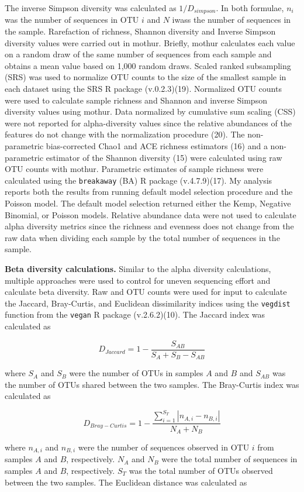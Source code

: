 \documentclass[
]{article}
\begin{document}
The inverse Simpson diversity was calculated as \(1/D_{simpson}\). In
both formulae, \(n_i\) was the number of sequences in OTU \(i\) and
\(N\) iwass the number of sequences in the sample. Rarefaction of
richness, Shannon diversity and Inverse Simpson diversity values were
carried out in mothur. Briefly, mothur calculates each value on a random
draw of the same number of sequences from each sample and obtains a mean
value based on 1,000 random draws. Scaled ranked subsampling (SRS) was
used to normalize OTU counts to the size of the smallest sample in each
dataset using the SRS R package (v.0.2.3)(19). Normalized OTU counts
were used to calculate sample richness and Shannon and inverse Simpson
diversity values using mothur. Data normalized by cumulative sum scaling
(CSS) were not reported for alpha-diversity values since the relative
abundances of the features do not change with the normalization
procedure (20). The non-parametric bias-corrected Chao1 and ACE richness
estimators (16) and a non-parametric estimator of the Shannon diversity
(15) were calculated using raw OTU counts with mothur. Parametric
estimates of sample richness were calculated using the
\texttt{breakaway} (BA) R package (v.4.7.9)(17). My analysis reports
both the results from running default model selection procedure and the
Poisson model. The default model selection returned either the Kemp,
Negative Binomial, or Poisson models. Relative abundance data were not
used to calculate alpha diversity metrics since the richness and
evenness does not change from the raw data when dividing each sample by
the total number of sequences in the sample.

\textbf{Beta diversity calculations.} Similar to the alpha diversity
calculations, multiple approaches were used to control for uneven
sequencing effort and calculate beta diversity. Raw and OTU counts were
used for input to calculate the Jaccard, Bray-Curtis, and Euclidean
dissimilarity indices using the \texttt{vegdist} function from the
\texttt{vegan} R package (v.2.6.2)(10). The Jaccard index was calculated
as

\[D_{Jaccard}=1-\frac{S_{AB}}{S_A+S_B-S_{AB}}\]

where \(S_A\) and \(S_B\) were the number of OTUs in samples \(A\) and
\(B\) and \(S_{AB}\) was the number of OTUs shared between the two
samples. The Bray-Curtis index was calculated as

\[D_{Bray-Curtis}=1-\frac{\sum_{i=1}^{S_T} \left| n_{A,i} - n_{B,i}\right| }{ N_A + N_B}\]

where \(n_{A,i}\) and \(n_{B,i}\) were the number of sequences observed
in OTU \(i\) from samples \(A\) and \(B\), respectively. \(N_A\) and
\(N_B\) were the total number of sequences in samples \(A\) and \(B\),
respectively. \(S_T\) was the total number of OTUs observed between the
two samples. The Euclidean distance was calculated as
\end{document}
